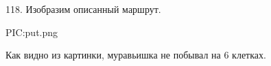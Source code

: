 118. Изобразим описанный маршрут.
\begin{center}
{{PIC:put.png}}
\end{center}
Как видно из картинки, муравьишка не побывал на 6 клетках.\\
